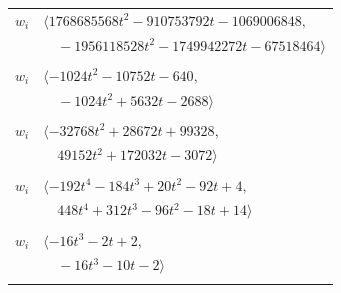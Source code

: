 \documentclass[11pt]{article}
\begin{document}
\begin{longtable}{@{}ll@{}}
$w_i$ & $\langle 1768685568t^{2}-910753792t-1069006848,$\\
 & $\quad -1956118528t^{2}-1749942272t-67518464\rangle$\\
\addlinespace[2pt]
\multicolumn{2}{@{}p{0.97\textwidth}@{}}{$i=15$, $D_i=8$, $e_i=1$, $\rho_{ij}$: $2{:}1, \allowbreak 9{:}1, \allowbreak 21{:}1, \allowbreak 31{:}1, \allowbreak 40{:}3, \allowbreak 48{:}3, \allowbreak 49{:}1, \allowbreak 50{:}2, \allowbreak 51{:}3, \allowbreak 53{:}1$}\\
$w_i$ & $\langle -1024t^{2}-10752t-640,$\\
 & $\quad -1024t^{2}+5632t-2688\rangle$\\
\addlinespace[2pt]
\multicolumn{2}{@{}p{0.97\textwidth}@{}}{$i=16$, $D_i=16$, $e_i=2$, $\rho_{ij}$: $23{:}2, \allowbreak 24{:}2, \allowbreak 25{:}1, \allowbreak 27{:}3, \allowbreak 34{:}1, \allowbreak 35{:}3, \allowbreak 44{:}3, \allowbreak 46{:}1, \allowbreak 47{:}1, \allowbreak 49{:}1, \allowbreak 52{:}3, \allowbreak 54{:}3, \allowbreak 73{:}1$}\\
$w_i$ & $\langle -32768t^{2}+28672t+99328,$\\
 & $\quad 49152t^{2}+172032t-3072\rangle$\\
\addlinespace[2pt]
\multicolumn{2}{@{}p{0.97\textwidth}@{}}{$i=17$, $D_i=4$, $\rho_{ij}$: $8{:}2, \allowbreak 11{:}3, \allowbreak 20{:}1, \allowbreak 22{:}3, \allowbreak 23{:}3, \allowbreak 28{:}2, \allowbreak 29{:}2, \allowbreak 33{:}2, \allowbreak 39{:}2, \allowbreak 49{:}1, \allowbreak 57{:}3, \allowbreak 59{:}3, \allowbreak 61{:}3$}\\
$w_i$ & $\langle -192t^{4}-184t^{3}+20t^{2}-92t+4,$\\
 & $\quad 448t^{4}+312t^{3}-96t^{2}-18t+14\rangle$\\
\addlinespace[2pt]
\multicolumn{2}{@{}p{0.97\textwidth}@{}}{$i=18$, $D_i=1$, $\rho_{ij}$: $3{:}1, \allowbreak 22{:}2, \allowbreak 24{:}1, \allowbreak 27{:}2, \allowbreak 28{:}1, \allowbreak 33{:}3, \allowbreak 45{:}3, \allowbreak 50{:}1, \allowbreak 52{:}1$}\\
$w_i$ & $\langle -16t^{3}-2t+2,$\\
 & $\quad -16t^{3}-10t-2\rangle$\\
\addlinespace[2pt]
\multicolumn{2}{@{}p{0.97\textwidth}@{}}{$i=19$, $D_i=2$, $\rho_{ij}$: $0{:}2, \allowbreak 2{:}1, \allowbreak 4{:}1, \allowbreak 23{:}3, \allowbreak 29{:}2, \allowbreak 37{:}1, \allowbreak 42{:}1, \allowbreak 51{:}2, \allowbreak 54{:}2, \allowbreak 61{:}1, \allowbreak 77{:}2$}\\

\end{longtable}
\end{document}
